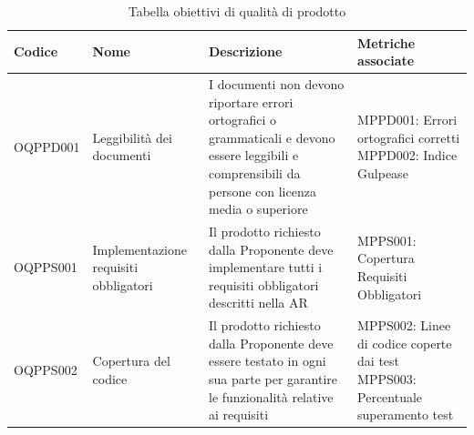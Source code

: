 \documentclass[openany,12pt,a4paper]{report}
\begin{document}
        \begin{longtable}{| p{2cm} | p{3.5cm} |p{5.5cm} | p{5.5cm} |}
        	\caption {Tabella obiettivi di qualità di prodotto} \label{tab:Tabella obiettivi di qualita di prodotto} \\
        	\hline
        	\textbf{Codice} & \textbf{Nome} & \textbf{Descrizione} & \textbf{Metriche associate}\\
        	\hline
        	\endhead
        	
        	\newline OQPPD001 &
        	\newline Leggibilità dei documenti &
        	\newline I documenti non devono riportare errori ortografici o grammaticali e devono essere leggibili e comprensibili da persone con licenza media o superiore \newline &
        	\newline MPPD001: Errori ortografici corretti
        	\newline MPPD002: Indice Gulpease
        	\\[1em]
        	
        	\hline
        	
        	\newline OQPPS001 &
        	\newline Implementazione requisiti obbligatori &
        	\newline Il prodotto richiesto dalla Proponente deve implementare tutti i requisiti obbligatori descritti nella AR \newline &
        	\newline MPPS001: Copertura Requisiti Obbligatori
        	\\[1em]
        	
        	\hline
        	\newline OQPPS002 &
        	\newline Copertura del codice &
        	\newline Il prodotto richiesto dalla Proponente deve essere testato in ogni sua parte per garantire le funzionalità relative ai requisiti \newline &
        	\newline MPPS002: Linee di codice coperte dai test
        	\newline MPPS003: Percentuale superamento test
        	\\[1em]
        	

\end{longtable}
\end{document}
